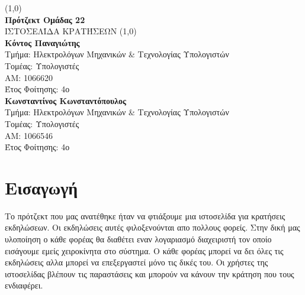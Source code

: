 \documentclass{acmart}
\begin{document}
       \begin{titlepage}
              \begin{center}
              \vspace*{1cm}

              \line(1,0){\textwidth}\\
              \textbf{Πρότζεκτ Ομάδας 22}\\
              \vspace{0.5cm}
              ΙΣΤΟΣΕΛΊΔΑ ΚΡΑΤΉΣΕΩΝ
              \vspace{1.5cm}
              \line(1,0){\textwidth}\\
              \textbf{Κόντος Παναγιώτης}\\
              Τμήμα: Ηλεκτρολόγων Μηχανικών \& Τεχνολογίας Υπολογιστών\\
              Τομέας: Υπολογιστές\\
              ΑΜ: 1066620\\
              Έτος Φοίτησης: 4ο\\
              \vspace{0.8cm}
              \textbf{Κωνσταντίνος Κωνσταντόπουλος}\\
                     Τμήμα: Ηλεκτρολόγων Μηχανικών \& Τεχνολογίας Υπολογιστών\\
              Τομέας: Υπολογιστές\\
              ΑΜ: 1066546\\
              Έτος Φοίτησης: 4ο\\

              \vspace{0.8cm}


              
              \end{center}
       \end{titlepage}
\tableofcontents
\newpage
\section{Εισαγωγή}
Το πρότζεκτ που μας ανατέθηκε ήταν να φτιάξουμε μια ιστοσελίδα για κρατήσεις εκδηλώσεων. 
Οι εκδηλώσεις αυτές φιλοξενούνται απο πολλους φορείς. Στην δική μας υλοποίηση ο κάθε φορέας 
θα διαθέτει εναν λογαριασμό διαχειριστή τον οποίο εισάγουμε εμείς χειροκίνητα στο σύστημα. 
Ο κάθε φορέας μπορεί να δει όλες τις εκδηλώσεις αλλα μπορεί να επεξεργαστεί μόνο τις δικές του. 
Οι χρήστες της ιστοσελίδας βλέπουν τις παραστάσεις και μπορούν να κάνουν την κράτηση που τους ενδιαφέρει.  
\end{document}
